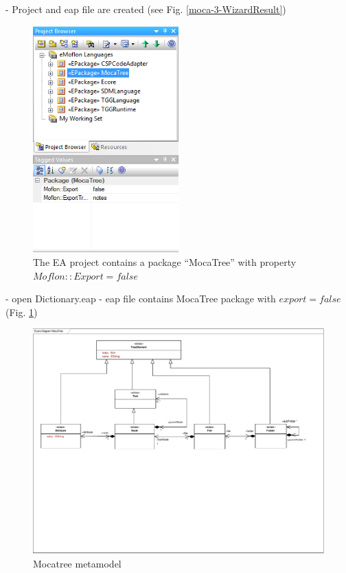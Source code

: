 - Project and eap file are created (see Fig. \ref{moca-3-WizardResult})

\begin{figure}[!htbp]
\begin{center}
 \includegraphics[width=0.5\textwidth]{pics/moca/1DictionaryMetaModel/4-eapContainsMocatreeWithExportFalse}
  \caption{The EA project contains a package ``MocaTree'' with property
  $Moflon::Export = false$}
  \label{moca-4-eapContainsMocatreeWithExportFalse}
\end{center}
\end{figure}

- open Dictionary.eap
- eap file contains MocaTree package with $export = false$ (Fig.
\ref{moca-4-eapContainsMocatreeWithExportFalse})

\begin{figure}[!htbp]
\begin{center}
 \includegraphics[width=\textwidth]{pics/moca/0Install/0-MocaTree}
  \caption{Mocatree metamodel}
  \label{moca-tree}
\end{center}
\end{figure}


